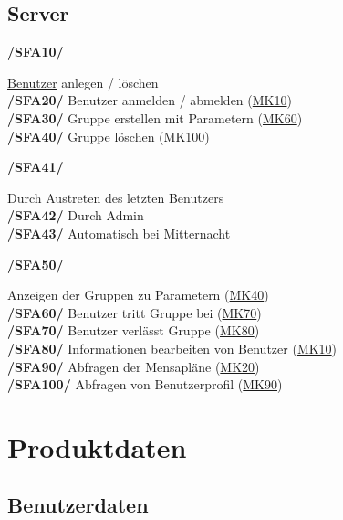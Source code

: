 \documentclass[a4paper]{scrreprt}
\begin{document}
\section{Server}

\begin{addmargin}[25pt]{0pt} 
\hypertarget{sfa10}{\textbf{/SFA10/}} \hyperlink{benutzer}{Benutzer} anlegen / löschen\\
\hypertarget{sfa20}{\textbf{/SFA20/}} Benutzer anmelden / abmelden (\hyperlink{mk10}{MK10})\\
\hypertarget{sfa30}{\textbf{/SFA30/}} Gruppe erstellen mit Parametern (\hyperlink{mk60}{MK60})\\
\hypertarget{sfa40}{\textbf{/SFA40/}} Gruppe löschen (\hyperlink{mk100}{MK100})\\
	\begin{addmargin}[25pt]{0pt} 
	\hypertarget{sfa41}{\textbf{/SFA41/}} Durch Austreten des letzten Benutzers\\
	\hypertarget{sfa42}{\textbf{/SFA42/}} Durch Admin\\
	\hypertarget{sfa43}{\textbf{/SFA43/}} Automatisch bei Mitternacht\\
	\end{addmargin}
\hypertarget{sfa50}{\textbf{/SFA50/}} Anzeigen der Gruppen zu Parametern (\hyperlink{m40}{MK40})\\
\hypertarget{sfa60}{\textbf{/SFA60/}} Benutzer tritt Gruppe bei (\hyperlink{m70}{MK70})\\
\hypertarget{sfa70}{\textbf{/SFA70/}} Benutzer verlässt Gruppe (\hyperlink{m80}{MK80})\\
\hypertarget{sfa80}{\textbf{/SFA80/}} Informationen bearbeiten von Benutzer (\hyperlink{m10}{MK10})\\
\hypertarget{sfa90}{\textbf{/SFA90/}} Abfragen der Mensapläne (\hyperlink{m20}{MK20})\\
\hypertarget{sfa100}{\textbf{/SFA100/}} Abfragen von Benutzerprofil (\hyperlink{m90}{MK90})\\
\end{addmargin}

\chapter{Produktdaten}

\section{Benutzerdaten}
\end{document}

